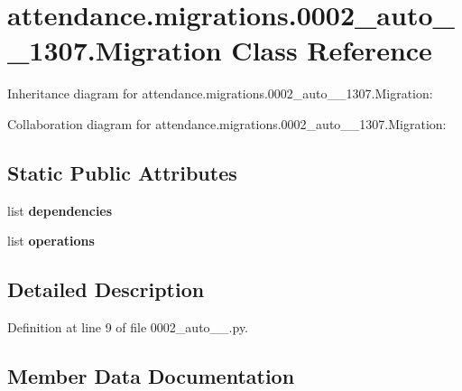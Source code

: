 \hypertarget{classattendance_1_1migrations_1_10002__auto__20160902__1307_1_1_migration}{}\section{attendance.\+migrations.0002\+\_\+auto\+\_\+\_\+1307.Migration Class Reference}
\label{classattendance_1_1migrations_1_10002__auto__20160902__1307_1_1_migration}


Inheritance diagram for attendance.\+migrations.0002\+\_\+auto\+\_\+\_\+1307.Migration\+:


Collaboration diagram for attendance.\+migrations.0002\+\_\+auto\+\_\+\_\+1307.Migration\+:
\subsection*{Static Public Attributes}
\begin{DoxyCompactItemize}
\item 
list {\bfseries dependencies}
\item 
list {\bfseries operations}
\end{DoxyCompactItemize}


\subsection{Detailed Description}


Definition at line 9 of file 0002\+\_\+auto\+\_\+\_.\+py.



\subsection{Member Data Documentation}
\hypertarget{classattendance_1_1migrations_1_10002__auto__20160902__1307_1_1_migration_a2da3600d65182a3c7a254578ea2eb0d8}{}\label{classattendance_1_1migrations_1_10002__auto__20160902__1307_1_1_migration_a2da3600d65182a3c7a254578ea2eb0d8} 
